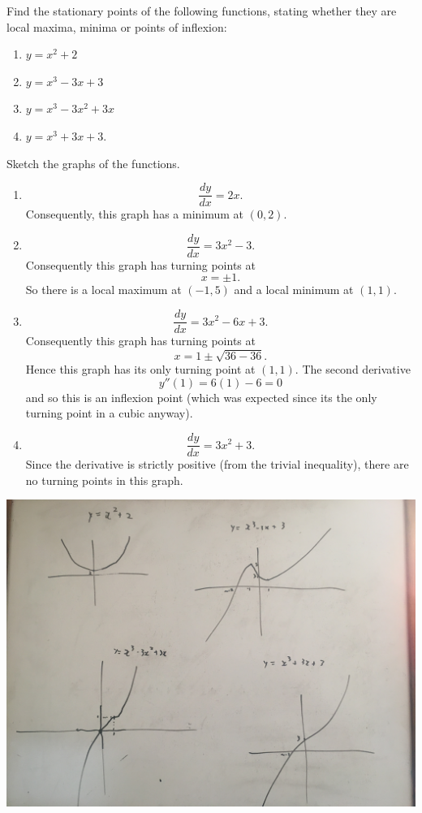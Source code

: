 Find the stationary points of the following functions, stating whether they are local maxima, minima or points of inflexion:
\begin{enumerate}
\item $y=x^2+2$
\item $y = x^3 - 3x+3$
\item $y = x^3 -3x^2 + 3x$ 
\item $y = x^3 + 3x + 3$.
\end{enumerate}
Sketch the graphs of the functions.
\newline
\begin{enumerate}
\item
\[
\frac{dy}{dx} = 2x.
\]
Consequently, this graph has a minimum at $(0,2)$.
\item
\[
\frac{dy}{dx} = 3x^2 - 3.
\]
Consequently this graph has turning points at 
\[
x = \pm 1.
\]
So there is a local maximum at $(-1, 5)$ and a local minimum at $(1,1)$.
\item
\[
\frac{dy}{dx} = 3x^2 -6x +3.
\]
Consequently this graph has turning points at
\[
x = 1\pm\sqrt{36-36} .
\]
Hence this graph has its only turning point at $(1,1)$. The second derivative
\[
y''(1) = 6(1) - 6 = 0
\]
and so this is an inflexion point (which was expected since its the only turning point in a cubic anyway).
\item
\[
\frac{dy}{dx} = 3x^2 + 3.
\]
Since the derivative is strictly positive (from the trivial inequality), there are no turning points in this graph.
\end{enumerate}
\begin{center}
\includegraphics[scale = 0.1]{media/Sketching_from_derivatives}
\end{center}